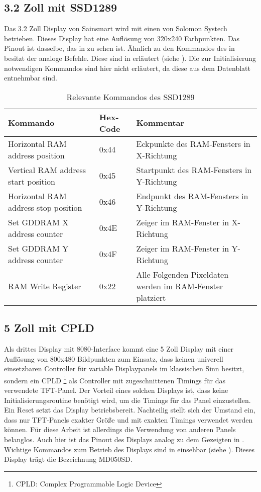 \subsection{3.2 Zoll mit SSD1289}
Das 3.2 Zoll Display von Sainsmart wird mit einen  von Solomon Systech betrieben. Dieses Display hat eine Auflösung von 320x240 Farbpunkten. Das Pinout ist dasselbe, das in  zu sehen ist. Ähnlich zu den Kommandos des  in  besitzt der  analoge Befehle. Diese sind in   erläutert (siehe \cite{SSD2007}). Die zur Initialisierung notwendigen Kommandos sind hier nicht erläutert, da diese aus dem Datenblatt entnehmbar sind.
\begin{table}[h]
\begin{tabular}{|p{4cm}|p{1cm}|p{8cm}|}\hline
\rowcolor{TableBackgroundColor}
   \textbf{Kommando} & \textbf{Hex-Code} & \textbf{Kommentar}\\ \hline
   Horizontal RAM address position & 0x44 & Eckpunkte des RAM-Fensters in X-Richtung \\ \hline
   Vertical RAM address start position & 0x45 & Startpunkt des RAM-Fensters in Y-Richtung \\ \hline
   Horizontal RAM address stop position & 0x46 & Endpunkt des  RAM-Fensters in Y-Richtung \\ \hline
   Set GDDRAM X address counter & 0x4E & Zeiger im  RAM-Fenster in X-Richtung \\ \hline
   Set GDDRAM Y address counter & 0x4F & Zeiger im RAM-Fenster in Y-Richtung \\ \hline
   RAM Write  Register & 0x22 & Alle Folgenden Pixeldaten werden im RAM-Fenster platziert \\ \hline
\end{tabular}
\caption{Relevante Kommandos des SSD1289}
\label{tab:Kommandos_SSD1289}
\end{table}


\subsection{5 Zoll mit CPLD}
Als drittes Display mit 8080-Interface kommt eine 5 Zoll Display mit einer Auflösung von 800x480 Bildpunkten zum Einsatz, dass keinen univerell einsetzbaren Controller für variable Displaypanels im klassischen Sinn besitzt, sondern ein CPLD \footnote{CPLD: Complex Programmable Logic Device} als Controller mit zugeschnittenen Timings für das verwendete TFT-Panel. Der Vorteil eines solchen Displays ist, dass keine Initialisierungsroutine benötigt wird, um die Timings für das Panel einzustellen. Ein Reset setzt das Display betriebsbereit. Nachteilig stellt sich der Umstand ein, dass nur TFT-Panels exakter Größe und mit exakten Timings verwendet werden können. Für diese Arbeit ist allerdings die Verwendung von anderen Panels belanglos. Auch hier ist das Pinout des Displays analog zu dem Gezeigten in .\newline
Wichtige Kommandos zum Betrieb des Displays sind in  einsehbar (siehe \cite{ITEAD2013}). Dieses Display trägt die Bezeichnung MD050SD.

